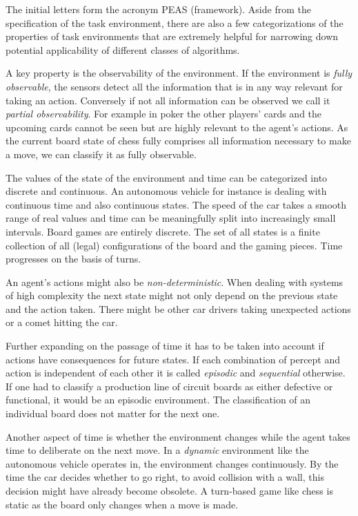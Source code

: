 The initial letters form the acronym PEAS (framework). Aside from the specification of the task environment, there are also a few categorizations of the properties of task environments that are extremely helpful for narrowing down potential applicability of different classes of algorithms.

A key property is the observability of the environment. If the environment is \textit{fully observable}, the sensors detect all the information that is in any way relevant for taking an action. Conversely if not all information can be observed we call it \textit{partial observability}. For example in poker the other players' cards and the upcoming cards cannot be seen but are highly relevant to the agent's actions. As the current board state of chess fully comprises all information necessary to make a move, we can classify it as fully observable.

The values of the state of the environment and time can be categorized into discrete and continuous. An autonomous vehicle for instance is dealing with continuous time and also continuous states. The speed of the car takes a smooth range of real values and time can be meaningfully split into increasingly small intervals. Board games are entirely discrete. The set of all states is a finite collection of all (legal) configurations of the board and the gaming pieces. Time progresses on the basis of turns.

An agent's actions might also be \textit{non-deterministic}. When dealing with systems of high complexity the next state might not only depend on the previous state and the action taken. There might be other car drivers taking unexpected actions or a comet hitting the car.

Further expanding on the passage of time it has to be taken into account if actions have consequences for future states. If each combination of percept and action is independent of each other it is called \textit{episodic} and \textit{sequential} otherwise. If one had to classify a production line of circuit boards as either defective or functional, it would be an episodic environment. The classification of an individual board does not matter for the next one.

Another aspect of time is whether the environment changes while the agent takes time to deliberate on the next move. In a \textit{dynamic} environment like the autonomous vehicle operates in, the environment changes continuously. By the time the car decides whether to go right, to avoid collision with a wall, this decision might have already become obsolete. A  turn-based game like chess is static as the board only changes when a move is made.

